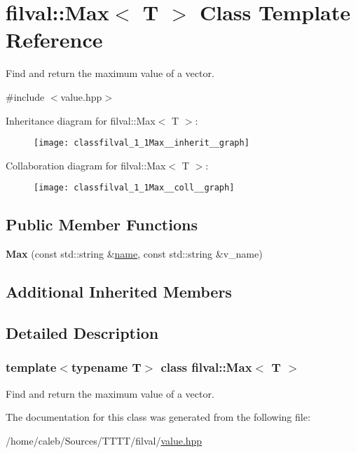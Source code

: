 \hypertarget{classfilval_1_1Max}{}\section{filval\+:\+:Max$<$ T $>$ Class Template Reference}
\label{classfilval_1_1Max}


Find and return the maximum value of a vector.  




{\ttfamily \#include $<$value.\+hpp$>$}



Inheritance diagram for filval\+:\+:Max$<$ T $>$\+:
\nopagebreak
\begin{figure}[H]
\begin{center}
\leavevmode
\texttt{[image: classfilval\_1\_1Max\_\_inherit\_\_graph]}
\end{center}
\end{figure}


Collaboration diagram for filval\+:\+:Max$<$ T $>$\+:
\nopagebreak
\begin{figure}[H]
\begin{center}
\leavevmode
\texttt{[image: classfilval\_1\_1Max\_\_coll\_\_graph]}
\end{center}
\end{figure}
\subsection*{Public Member Functions}
\begin{DoxyCompactItemize}
\item 
\hypertarget{classfilval_1_1Max_a61ab1d419ea30128eb53ea8768a780cb}{}\label{classfilval_1_1Max_a61ab1d419ea30128eb53ea8768a780cb} 
{\bfseries Max} (const std\+::string \&\hyperlink{classfilval_1_1GenValue_a007e38c03ee041c2a657afa3d6e91ab1}{name}, const std\+::string \&v\+\_\+name)
\end{DoxyCompactItemize}
\subsection*{Additional Inherited Members}


\subsection{Detailed Description}
\subsubsection*{template$<$typename T$>$\newline
class filval\+::\+Max$<$ T $>$}

Find and return the maximum value of a vector. 

The documentation for this class was generated from the following file\+:\begin{DoxyCompactItemize}
\item 
/home/caleb/\+Sources/\+T\+T\+T\+T/filval/\hyperlink{value_8hpp}{value.\+hpp}\end{DoxyCompactItemize}

